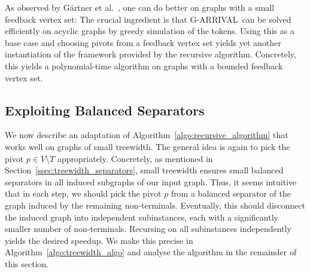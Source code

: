 \documentclass[a4paper,UKenglish,cleveref, autoref, thm-restate]{lipics-v2021}
\newcommand{\problem}[1]{\textrm{#1}}
\newcommand{\garrival}{\problem{G-ARRIVAL}}
\begin{document}
As observed by Gärtner et al.\@~\cite{gartnerSubexponentialAlgorithmARRIVAL2021}, one can do better on graphs with a small feedback vertex set: The crucial ingredient is that \garrival\ can be solved efficiently on acyclic graphs by greedy simulation of the tokens. Using this as a base case and choosing pivots from a feedback vertex set yields yet another instantiation of the framework provided by the recursive algorithm. Concretely, this yields a polynomial-time algorithm on graphs with a bounded feedback vertex set.  

\subsection{Exploiting Balanced Separators}
\label{ssec:exploiting_balanced_separators}

We now describe an adaptation of 
Algorithm~\ref{algo:recursive_algorithm} that works well on graphs of small treewidth. The general idea is again to pick the pivot $p \in V \setminus T$ appropriately. Concretely, as mentioned in Section~\ref{ssec:treewidth_separators}, small treewidth ensures small balanced separators in all induced subgraphs of our input graph. Thus, it seems intuitive that in each step, we should pick the pivot $p$ from a balanced separator of the graph induced by the remaining non-terminals. Eventually, this should disconnect the induced graph into independent subinstances, each with a significantly smaller number of non-terminals. Recursing on all subinstances independently yields the desired speedup. We make this precise in Algorithm~\ref{algo:treewidth_algo} and analyse the algorithm in the remainder of this section.
\end{document}
